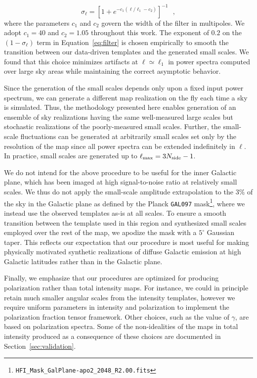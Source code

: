 \documentclass[twocolumn]{aastex631}
\begin{document}
\begin{equation} \label{eq:filter2}
\sigma_\ell  = \left[1+  e^{ -c_1 (\ell/ \ell_1  -c_2 )}\right]^{-1}  
~~~,
\end{equation}
where the parameters $c_1$ and $c_2$ govern the width of the filter in multipoles. We adopt $c_1=40$ and $c_2=1.05$ throughout this work. The exponent of $0.2$ on the $\left(1-\sigma_\ell\right)$ term in Equation~\ref{eq:filter} is chosen empirically to smooth the transition between our data-driven templates and the generated small scales. We found that this choice minimizes artifacts at $\ell \simeq \ell_1$ in power spectra computed over large sky areas while maintaining the correct asymptotic behavior.

Since the generation of the small scales depends only upon a fixed input power spectrum, we can generate a different map realization on the fly each time a sky is simulated. Thus, the methodology presented here enables generation of an ensemble of sky realizations having the same well-measured large scales but stochastic realizations of the poorly-measured small scales. Further, the small-scale fluctuations can be generated at arbitrarily small scales set only by the resolution of the map since all power spectra can be extended indefinitely in $\ell$. In practice, small scales are generated up to $\ell_{\rm max} = 3N_{\rm side}-1$.

We do not intend for the above procedure to be useful for the inner Galactic plane, which has been imaged at high signal-to-noise ratio at relatively small scales. We thus do not apply the small-scale amplitude extrapolation to the $3\%$ of the sky in the Galactic plane as defined by the Planck \texttt{GAL097} mask\footnote{\texttt{HFI\_Mask\_GalPlane-apo2\_2048\_R2.00.fits}}, where we instead use the observed templates as-is at all scales. To ensure a smooth transition between the template used in this region and synthesized small scales employed over the rest of the map, we apodize the mask with a $5^\circ$ Gaussian taper. This reflects our expectation that our procedure is most useful for making physically motivated synthetic realizations of diffuse Galactic emission at high Galactic latitudes rather than in the Galactic plane.

Finally, we emphasize that our procedures are optimized for producing polarization rather than total intensity maps. For instance, we could in principle retain much smaller angular scales from the intensity templates, however we require uniform parameters in intensity and polarization to implement the polarization fraction tensor framework. Other choices, such as the value of $\gamma$, are based on polarization spectra. Some of the non-idealities of the maps in total intensity produced as a consequence of these choices are documented in Section~\ref{sec:validation}.
\end{document}
